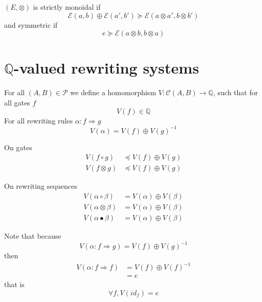 \documentclass[a4paper]{article}
\begin{document}
\begin{definition}
  $(E, \otimes)$ is strictly monoidal if
  \[
    \mathcal{E}(a, b) \oplus \mathcal{E}(a', b') \succeq \mathcal{E}(a \otimes
      a', b \otimes b')
  \]
  and symmetric if
  \[
    e \succeq \mathcal{E}(a \otimes b, b \otimes a)
  \]
\end{definition}



\section{$\mathbb{Q}$-valued rewriting systems}

\begin{definition}
  For all $(A, B) \in \mathcal{P}$ we define a homomorphism $V:
    \mathcal{C}(A, B) \to \mathbb{Q}$, such that for all gates $f$
  \[
    V(f) \in \mathbb{Q}
  \]
  For all rewriting rules $\alpha: f \Rightarrow g$
  \[
    V(\alpha) = V(f) \oplus V(g)^{-1}
  \]
  
  On gates
  \begin{align}
    V(f \circ g) &\preceq V(f) \oplus V(g) \\
    V(f \otimes g) &\preceq V(f) \oplus V(g)
  \end{align}
  
  On rewriting sequences
  \begin{align}
    V(\alpha \circ \beta) &= V(\alpha) \oplus V(\beta) \\
    V(\alpha \otimes \beta) &= V(\alpha) \oplus V(\beta) \\
    V(\alpha \bullet \beta) &= V(\alpha) \oplus V(\beta)
  \end{align}
\end{definition}

\begin{remark}
  Note that because
  \[
    V(\alpha: f \Rightarrow g) = V(f) \oplus V(g)^{-1}
  \]
  then
  \begin{align}
    V(\alpha: f \Rightarrow f) &= V(f) \oplus V(f)^{-1} \\
    &= e
  \end{align}
  that is
  \[
    \forall f, V(id_f) = e
  \]
\end{remark}
\end{document}
